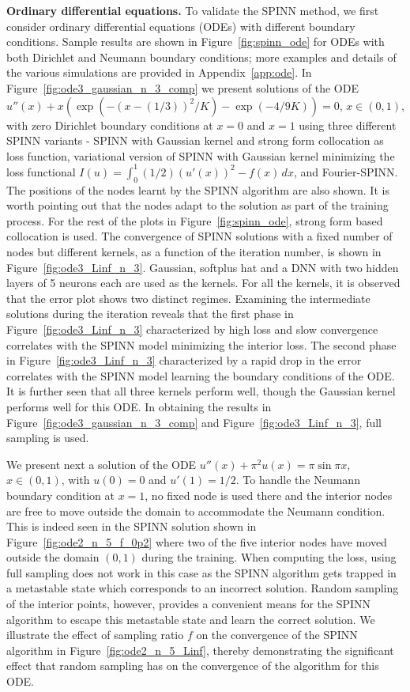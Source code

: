 \documentclass[12pt]{article}
\begin{document}
\textbf{Ordinary differential equations.} To validate the SPINN method, we first consider ordinary differential equations (ODEs) with different boundary conditions. Sample results are shown in Figure~\ref{fig:spinn_ode} for ODEs with both Dirichlet and Neumann boundary conditions; more examples and details of the various simulations are provided in Appendix~\ref{app:ode}. In Figure~\ref{fig:ode3_gaussian_n_3_comp} we present solutions of the ODE $u''(x) + x(\exp (-(x - (1/3))^2/K) - \exp (-4/9K)) = 0$, $x \in (0,1)$, with zero Dirichlet boundary conditions at $x=0$ and $x=1$ using three different SPINN variants - SPINN with Gaussian kernel and strong form collocation as loss function, variational version of SPINN with Gaussian kernel minimizing the loss functional $I(u) = \int_0^1 (1/2)(u'(x))^2 - f(x)\, dx$, and Fourier-SPINN. The positions of the nodes learnt by the SPINN algorithm are also shown. It is worth pointing out that the nodes adapt to the solution as part of the training process. For the rest of the plots in Figure~\ref{fig:spinn_ode}, strong form based collocation is used. The convergence of SPINN solutions with a fixed number of nodes but different kernels, as a function of the iteration number, is shown in Figure~\ref{fig:ode3_Linf_n_3}. Gaussian, softplus hat and a DNN with two hidden layers of 5 neurons each are used as the kernels. For all the kernels, it is observed that the error plot shows two distinct regimes. Examining the intermediate solutions during the iteration reveals that the first phase in Figure~\ref{fig:ode3_Linf_n_3} characterized by high loss and slow convergence correlates with the SPINN model minimizing the interior loss. The second phase in Figure~\ref{fig:ode3_Linf_n_3} characterized by a rapid drop in the error correlates with the SPINN model learning the boundary conditions of the ODE. It is further seen that all three kernels perform well, though the Gaussian kernel performs well for this ODE. In obtaining the results in Figure~\ref{fig:ode3_gaussian_n_3_comp} and Figure~\ref{fig:ode3_Linf_n_3}, full sampling is used.

We present next a solution of the ODE $u''(x) + \pi^2 u(x) = \pi \sin \pi x$, $x \in (0,1)$, with $u(0) = 0$ and $u'(1) = 1/2$. To handle the Neumann boundary condition at $x=1$, no fixed node is used there and the interior nodes are free to move outside the domain to accommodate the Neumann condition. This is indeed seen in the SPINN solution shown in Figure~\ref{fig:ode2_n_5_f_0p2} where two of the five interior nodes have moved outside the domain $(0,1)$ during the training. When computing the loss, using full sampling does not work in this case as the SPINN algorithm gets trapped in a metastable state which corresponds to an incorrect solution. Random sampling of the interior points, however, provides a convenient means for the SPINN algorithm to escape this metastable state and learn the correct solution. We illustrate the effect of sampling ratio $f$ on the convergence of the SPINN algorithm in Figure~\ref{fig:ode2_n_5_Linf}, thereby demonstrating the significant effect that random sampling has on the convergence of the algorithm for this ODE.
\end{document}
